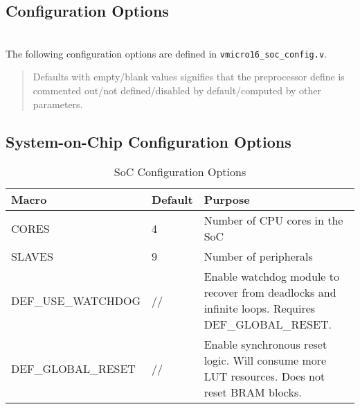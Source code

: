 \begin{appendices}
\chapter{Configuration Options}
\label{sect:config}
\startcontents[chapters]

\noindent\\
The following configuration options are defined in \verb|vmicro16_soc_config.v|.

\begin{quote}
Defaults with empty/blank values signifies that the preprocessor define is commented out/not defined/disabled by default/computed by other parameters.
\end{quote}

\section{System-on-Chip Configuration Options}
\begin{table}[H]
\centering
\label{tab:isa}
\begin{tabularx}{\textwidth}{l|l|p{8cm}}
Macro      & Default & Purpose                         \\ 
\hline
CORES  & 4       & Number of CPU cores in the SoC  \\
SLAVES & 9       & Number of peripherals  \\    
DEF\_USE\_WATCHDOG & //  & Enable watchdog module to recover from deadlocks and infinite loops. Requires DEF\_GLOBAL\_RESET. \\    
DEF\_GLOBAL\_RESET           & //      & Enable synchronous reset logic. Will consume more LUT resources. Does not reset BRAM blocks.\\
\end{tabularx}
\caption{SoC Configuration Options}
\end{table}


\end{appendices}
